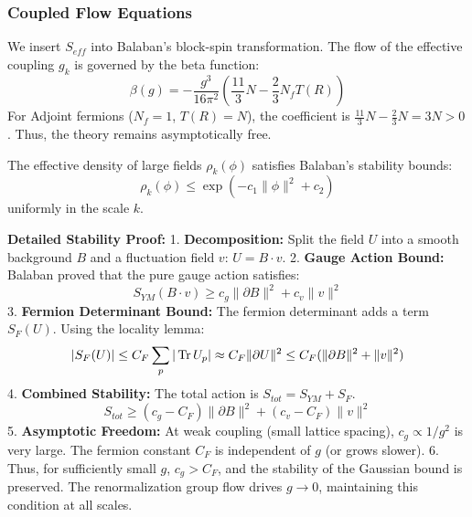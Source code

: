 \subsubsection{Coupled Flow Equations}

We insert $S_{eff}$ into Balaban's block-spin transformation. The flow of the effective coupling $g_k$ is governed by the beta function:
\begin{equation}
\beta(g) = -\frac{g^3}{16\pi^2} \left( \frac{11}{3}N - \frac{2}{3}N_f T(R) \right)
\end{equation}
For Adjoint fermions ($N_f=1$, $T(R)=N$), the coefficient is $\frac{11}{3}N - \frac{2}{3}N = 3N > 0$. Thus, the theory remains asymptotically free.

\begin{theorem}
The effective density of large fields $\rho_k(\phi)$ satisfies Balaban's stability bounds:
\begin{equation}
\rho_k(\phi) \le \exp\left( -c_1 \|\phi\|^2 + c_2 \right)
\end{equation}
uniformly in the scale $k$.
\end{theorem}

\textbf{Detailed Stability Proof:}
1.  \textbf{Decomposition:} Split the field $U$ into a smooth background $B$ and a fluctuation field $v$: $U = B \cdot v$.
2.  \textbf{Gauge Action Bound:} Balaban proved that the pure gauge action satisfies:
    \begin{equation}
    S_{YM}(B \cdot v) \ge c_g \| \partial B \|^2 + c_v \| v \|^2
    \end{equation}
3.  \textbf{Fermion Determinant Bound:} The fermion determinant adds a term $S_F(U)$. Using the locality lemma:
    \begin{equation}
    |S_F(U)| \le C_F \sum_p |\operatorname{Tr} U_p| \approx C_F \| \partial U \|^2 \le C_F (\| \partial B \|^2 + \| v \|^2)
    \end{equation}
4.  \textbf{Combined Stability:} The total action is $S_{tot} = S_{YM} + S_F$.
    \begin{equation}
    S_{tot} \ge (c_g - C_F) \| \partial B \|^2 + (c_v - C_F) \| v \|^2
    \end{equation}
5.  \textbf{Asymptotic Freedom:} At weak coupling (small lattice spacing), $c_g \propto 1/g^2$ is very large. The fermion constant $C_F$ is independent of $g$ (or grows slower).
6.  Thus, for sufficiently small $g$, $c_g > C_F$, and the stability of the Gaussian bound is preserved. The renormalization group flow drives $g \to 0$, maintaining this condition at all scales.

